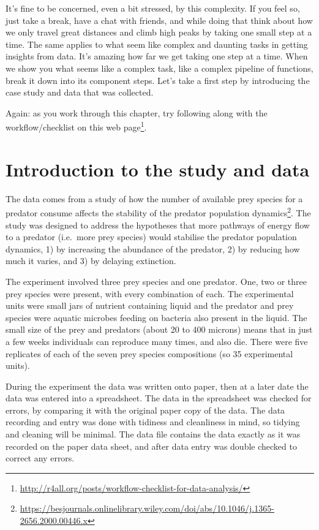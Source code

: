 \documentclass[]{book}
\renewcommand{\href}[2]{#2\footnote{\url{#1}}}
\begin{document}
It's fine to be concerned, even a bit stressed, by this complexity. If you feel so, just take a break, have a chat with friends, and while doing that think about how we only travel great distances and climb high peaks by taking one small step at a time. The same applies to what seem like complex and daunting tasks in getting insights from data. It's amazing how far we get taking one step at a time. When we show you what seems like a complex task, like a complex pipeline of functions, break it down into its component steps. Let's take a first step by introducing the case study and data that was collected.

Again: as you work through this chapter, try following along with the \href{http://r4all.org/posts/workflow-checklist-for-data-analysis/}{workflow/checklist on this web page}.

\hypertarget{introduction-to-the-study-and-data-1}{%
\section{Introduction to the study and data}\label{introduction-to-the-study-and-data-1}}

The data comes from \href{https://besjournals.onlinelibrary.wiley.com/doi/abs/10.1046/j.1365-2656.2000.00446.x}{a study of how the number of available prey species for a predator consume affects the stability of the predator population dynamics}. The study was designed to address the hypotheses that more pathways of energy flow to a predator (i.e.~more prey species) would stabilise the predator population dynamics, 1) by increasing the abundance of the predator, 2) by reducing how much it varies, and 3) by delaying extinction.

The experiment involved three prey species and one predator. One, two or three prey species were present, with every combination of each. The experimental units were small jars of nutrient containing liquid and the predator and prey species were aquatic microbes feeding on bacteria also present in the liquid. The small size of the prey and predators (about 20 to 400 microns) means that in just a few weeks individuals can reproduce many times, and also die. There were five replicates of each of the seven prey species compositions (so 35 experimental units).

During the experiment the data was written onto paper, then at a later date the data was entered into a spreadsheet. The data in the spreadsheet was checked for errors, by comparing it with the original paper copy of the data. The data recording and entry was done with tidiness and cleanliness in mind, so tidying and cleaning will be minimal. The data file contains the data exactly as it was recorded on the paper data sheet, and after data entry was double checked to correct any errors.
\end{document}

